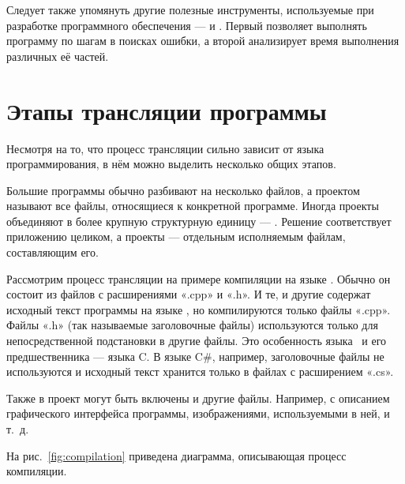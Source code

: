 Следует также упомянуть другие полезные инструменты, используемые при
разработке программного обеспечения —  и
. Первый позволяет выполнять
программу по шагам в поисках ошибки, а второй анализирует время
выполнения различных её частей.

\section{Этапы трансляции программы}

Несмотря на то, что процесс трансляции сильно зависит от языка
программирования, в нём можно выделить несколько общих этапов.

Большие программы обычно разбивают на несколько файлов, а проектом
называют все файлы, относящиеся к конкретной программе.  Иногда
проекты объединяют в более крупную структурную единицу —
.  Решение соответствует приложению целиком, а
проекты — отдельным исполняемым файлам, составляющим его.

Рассмотрим процесс трансляции на примере компиляции
 на языке \CPP. Обычно он состоит из файлов с
расширениями «.cpp» и «.h».  И те, и другие содержат исходный текст
программы на языке \CPP, но компилируются только файлы «.cpp». Файлы
«.h» (так называемые заголовочные файлы) используются только для
непосредственной подстановки в другие файлы. Это особенность языка
\CPP\ и его предшественника — языка C.  В языке C\#, например,
заголовочные файлы не используются и исходный текст хранится только в
файлах с расширением «.cs».

Также в проект могут быть включены и другие файлы. Например, с
описанием графического интерфейса программы, изображениями,
используемыми в ней, и т.~д.

На рис.~\ref{fig:compilation} приведена диаграмма, описывающая процесс
компиляции.

